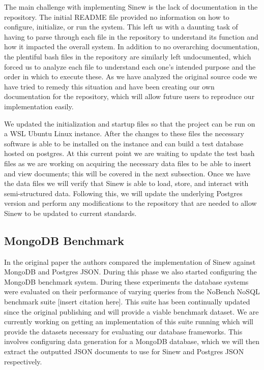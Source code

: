 \documentclass[sigconf]{acmart}
\begin{document}
    The main challenge with implementing Sinew is the lack of documentation in the repository. The initial README file provided no information on how to configure, initialize, or run the system. This left us with a daunting task of having to parse through each file in the repository to understand its function and how it impacted the overall system. In addition to no overarching documentation, the plentiful bash files in the repository are similarly left undocumented, which forced us to analyze each file to understand each one's intended purpose and the order in which to execute these. As we have analyzed the original source code we have tried to remedy this situation and have been creating our own documentation for the repository, which will allow future users to reproduce our implementation easily.

    We updated the initialization and startup files so that the project can be run on a WSL Ubuntu Linux instance. After the changes to these files the necessary software is able to be installed on the instance and can build a test database hosted on postgres. At this current point we are waiting to update the test bash files as we are working on acquiring the necessary data files to be able to insert and view documents; this will be covered in the next subsection. Once we have the data files we will verify that Sinew is able to load, store, and interact with semi-structured data. Following this, we will update the underlying Postgres version and perform any modifications to the repository that are needed to allow Sinew to be updated to current standards.

    \subsection{MongoDB Benchmark}
    In the original paper the authors compared the implementation of Sinew against MongoDB and Postgres JSON. During this phase we also started configuring the MongoDB benchmark system. During these experiments the database systems were evaluated on their performance of varying queries from the NoBench NoSQL benchmark suite [insert citation here]. This suite has been continually updated since the original publishing and will provide a viable benchmark dataset. We are currently working on getting an implementation of this suite running which will provide the datasets necessary for evaluating our database frameworks. This involves configuring data generation for a MongoDB database, which we will then extract the outputted JSON documents to use for Sinew and Postgres JSON respectively.
\end{document}
